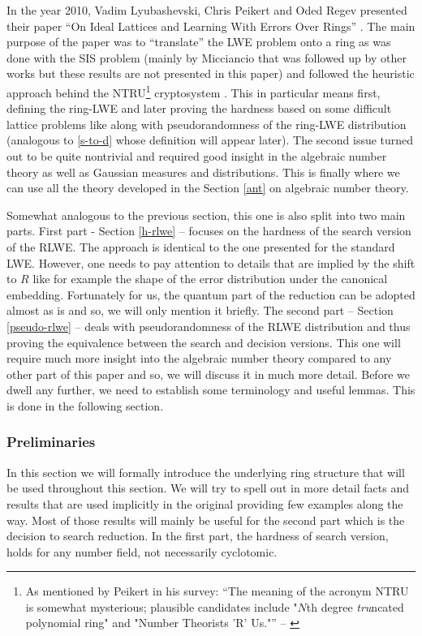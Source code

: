 In the year 2010, Vadim Lyubashevski, Chris Peikert and Oded Regev presented their paper ``On Ideal Lattices and Learning With Errors Over Rings'' \cite{ring-lwe}. The main purpose of the paper was to ``translate'' the LWE problem onto a ring as was done with the SIS problem (mainly by Micciancio \cite{ring-sis} that was followed up by other works but these results are not presented in this paper) and followed the heuristic approach behind the NTRU\footnote{As mentioned by Peikert in his survey: ``The meaning of the acronym NTRU is somewhat mysterious; plausible candidates include "$N$th degree \textit{tru}ncated polynomial ring" and "Number Theorists ’R’ Us."'' -- \cite{lattice-survey}} cryptosystem \cite{ntru}. This in particular means first, defining the ring-LWE and later proving the hardness based on some difficult lattice problems like  along with pseudorandomness of the ring-LWE distribution (analogous to \ref{s-to-d} whose definition will appear later). The second issue turned out to be quite nontrivial and required good insight in the algebraic number theory as well as Gaussian measures and distributions. This is finally where we can use all the theory developed in the Section \ref{ant} on algebraic number theory.

Somewhat analogous to the previous section, this one is also split into two main parts. First part - Section \ref{h-rlwe} -- focuses on the hardness of the search version of the RLWE. The approach is identical to the one presented for the standard LWE. However, one needs to pay attention to details that are implied by the shift to $R$ like for example the shape of the error distribution under the canonical embedding. Fortunately for us, the quantum part of the reduction can be adopted almost as is and so, we will only mention it briefly. The second part -- Section \ref{pseudo-rlwe} -- deals with pseudorandomness of the RLWE distribution and thus proving the equivalence between the search and decision versions. This one will require much more insight into the algebraic number theory compared to any other part of this paper and so, we will discuss it in much more detail. Before we dwell any further, we need to establish some terminology and useful lemmas. This is done in the following section.

\subsubsection{Preliminaries}
In this section we will formally introduce the underlying ring structure that will be used throughout this section. We will try to spell out in more detail facts and results that are used implicitly in the original \cite{ring-lwe} providing few examples along the way. Most of those results will mainly be useful for the second part which is the decision to search reduction. In the first part, the hardness of search version, holds for any number field, not necessarily cyclotomic.

